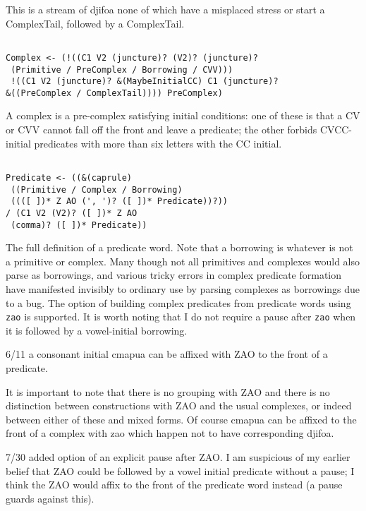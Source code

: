 \documentclass[12pt]{article}
\begin{document}
This is a stream of djifoa none of which have a misplaced stress or start a ComplexTail, followed by a ComplexTail.

\begin{verbatim}

Complex <- (!((C1 V2 (juncture)? (V2)? (juncture)?
 (Primitive / PreComplex / Borrowing / CVV)))
 !((C1 V2 (juncture)? &(MaybeInitialCC) C1 (juncture)? 
&((PreComplex / ComplexTail)))) PreComplex)

\end{verbatim}

A complex is a pre-complex satisfying initial conditions:  one of these is that a CV or CVV cannot fall off the front
and leave a predicate; the other forbids CVCC- initial predicates with more than six letters with the CC initial.

\begin{verbatim}

Predicate <- ((&(caprule)
 ((Primitive / Complex / Borrowing)
 ((([ ])* Z AO (', ')? ([ ])* Predicate))?)) 
/ (C1 V2 (V2)? ([ ])* Z AO
 (comma)? ([ ])* Predicate))

\end{verbatim}

The full definition of a predicate word.  Note that a borrowing is whatever is not a primitive or complex.  Many though not
all primitives and complexes would also parse as borrowings, and various tricky errors in complex predicate formation
have manifested invisibly to ordinary use by parsing complexes as borrowings due to a bug.  The option of building
complex predicates from predicate words using {\tt zao} is supported.  It is worth noting that I do not require a pause
after {\tt zao} when it is followed by a vowel-initial borrowing.

6/11 a consonant initial cmapua can be affixed with ZAO to the front of a predicate.

It is important to note that there is no grouping with ZAO and there is no distinction between constructions with ZAO and the usual complexes, or indeed between either of these and mixed forms.  Of course cmapua can be affixed to the front of a complex with zao which happen not to have corresponding djifoa.

7/30 added option of an explicit pause after ZAO.  I am suspicious of my earlier belief that ZAO could be followed by a vowel initial predicate without a pause; I think the ZAO would affix to the front of the predicate word instead (a pause guards against this).
\end{document}
